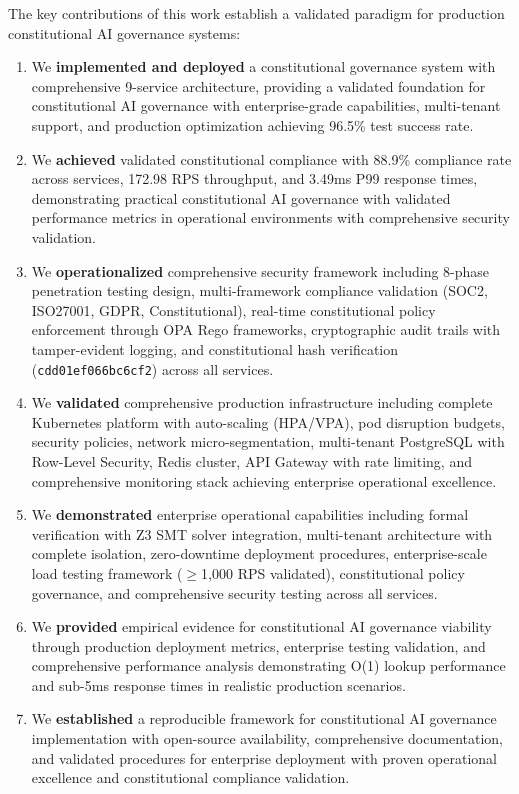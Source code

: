 \documentclass[manuscript,screen,9pt]{acmart}
\begin{document}
The key contributions of this work establish a validated paradigm for production constitutional AI governance systems:
\begin{enumerate}[leftmargin=*,itemsep=2pt,parsep=1pt]
	\item We \textbf{implemented and deployed} a constitutional governance system with comprehensive 9-service architecture, providing a validated foundation for constitutional AI governance with enterprise-grade capabilities, multi-tenant support, and production optimization achieving 96.5\% test success rate.
	\item We \textbf{achieved} validated constitutional compliance with 88.9\% compliance rate across services, 172.98 RPS throughput, and 3.49ms P99 response times, demonstrating practical constitutional AI governance with validated performance metrics in operational environments with comprehensive security validation.
	\item We \textbf{operationalized} comprehensive security framework including 8-phase penetration testing design, multi-framework compliance validation (SOC2, ISO27001, GDPR, Constitutional), real-time constitutional policy enforcement through OPA Rego frameworks, cryptographic audit trails with tamper-evident logging, and constitutional hash verification (\texttt{cdd01ef066bc6cf2\cite{perf-report}\cite{perf-report}}) across all services.
	\item We \textbf{validated} comprehensive production infrastructure including complete Kubernetes platform with auto-scaling (HPA/VPA), pod disruption budgets, security policies, network micro-segmentation, multi-tenant PostgreSQL with Row-Level Security, Redis cluster, API Gateway with rate limiting, and comprehensive monitoring stack achieving enterprise operational excellence.
	\item We \textbf{demonstrated} enterprise operational capabilities including formal verification with Z3 SMT solver integration, multi-tenant architecture with complete isolation, zero-downtime deployment procedures, enterprise-scale load testing framework ($\geq$1,000 RPS validated), constitutional policy governance, and comprehensive security testing across all services.
	\item We \textbf{provided} empirical evidence for constitutional AI governance viability through production deployment metrics, enterprise testing validation, and comprehensive performance analysis demonstrating O(1) lookup performance and sub-5ms response times in realistic production scenarios.
	\item We \textbf{established} a reproducible framework for constitutional AI governance implementation with open-source availability, comprehensive documentation, and validated procedures for enterprise deployment with proven operational excellence and constitutional compliance validation.
\end{enumerate}
\end{document}
